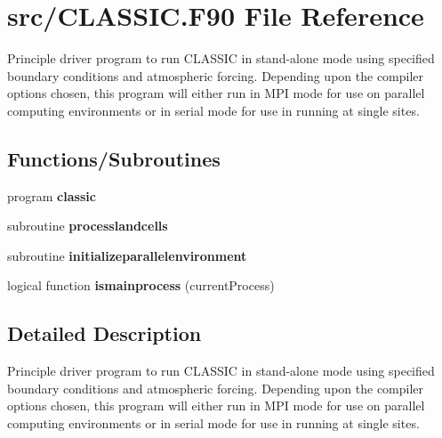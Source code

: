 \hypertarget{CLASSIC_8F90}{}\section{src/\+C\+L\+A\+S\+S\+I\+C.F90 File Reference}
\label{CLASSIC_8F90}


Principle driver program to run C\+L\+A\+S\+S\+I\+C in stand-\/alone mode using specified boundary conditions and atmospheric forcing. Depending upon the compiler options chosen, this program will either run in M\+P\+I mode for use on parallel computing environments or in serial mode for use in running at single sites.  


\subsection*{Functions/\+Subroutines}
\begin{DoxyCompactItemize}
\item 
\hypertarget{CLASSIC_8F90_a62220e741441754452847a4706bcae25}{}program {\bfseries classic}\label{CLASSIC_8F90_a62220e741441754452847a4706bcae25}

\item 
\hypertarget{CLASSIC_8F90_a23c7b8492b947781685fedee78c9037d}{}subroutine {\bfseries processlandcells}\label{CLASSIC_8F90_a23c7b8492b947781685fedee78c9037d}

\item 
\hypertarget{CLASSIC_8F90_a4f09ba230f1f1552651ad18d9d504b3e}{}subroutine {\bfseries initializeparallelenvironment}\label{CLASSIC_8F90_a4f09ba230f1f1552651ad18d9d504b3e}

\item 
\hypertarget{CLASSIC_8F90_a615bfd54efdbce44c8177b7b37a7e566}{}logical function {\bfseries ismainprocess} (current\+Process)\label{CLASSIC_8F90_a615bfd54efdbce44c8177b7b37a7e566}

\end{DoxyCompactItemize}


\subsection{Detailed Description}
Principle driver program to run C\+L\+A\+S\+S\+I\+C in stand-\/alone mode using specified boundary conditions and atmospheric forcing. Depending upon the compiler options chosen, this program will either run in M\+P\+I mode for use on parallel computing environments or in serial mode for use in running at single sites. 

